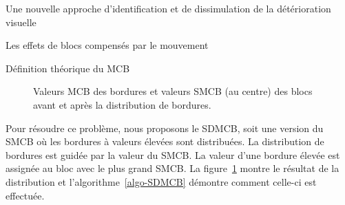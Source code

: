 \documentclass[letterpaper, twoside, 12pt,memoire]{thETS}
\newcommand{\fig}[1]{figure~\ref{#1}}
\begin{document}
\begin{chapter}{Une nouvelle approche d'identification et de dissimulation de la
détérioration visuelle}
\begin{section}{Les effets de blocs compensés par le mouvement}
\begin{subsection}{Définition théorique du MCB}
\begin{figure}
\caption{Valeurs MCB des bordures et valeurs SMCB (au centre) des blocs avant
 et après  la distribution de
bordures.}
\label{fig-GridMCB}
\end{figure}

Pour résoudre ce problème, nous proposons le SDMCB, soit une version du SMCB où
les bordures à valeurs élevées sont distribuées. La distribution de bordures est
guidée par la valeur du SMCB. La valeur d'une bordure élevée est assignée au
bloc avec le plus grand SMCB. La \fig{fig-GridMCB} montre le résultat de la
distribution et l'algorithme~\ref{algo-SDMCB} démontre comment celle-ci est
effectuée.


\end{subsection}
\end{section}
\end{chapter}
\end{document}
